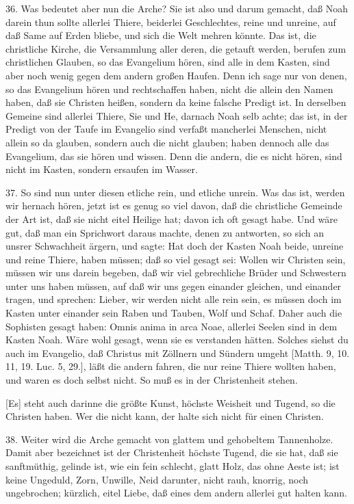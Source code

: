 36. Was bedeutet aber nun die Arche? Sie ist also und darum gemacht, daß Noah darein thun sollte allerlei Thiere, beiderlei Geschlechtes, reine und unreine, auf daß Same auf Erden bliebe, und sich die Welt mehren könnte. Das ist, die christliche Kirche, die Versammlung aller deren, die getauft werden, berufen zum christlichen Glauben, so das Evangelium hören, sind alle in dem Kasten, sind aber noch wenig gegen dem andern großen Haufen. Denn ich sage nur von denen, so das Evangelium hören und rechtschaffen haben, nicht die allein den Namen haben, daß sie Christen heißen, sondern da keine falsche Predigt ist. In derselben Gemeine sind allerlei Thiere, Sie und He, darnach Noah selb achte; das ist, in der Predigt von der Taufe im Evangelio sind verfaßt mancherlei Menschen, nicht allein so da glauben, sondern auch die nicht glauben; haben dennoch alle das Evangelium, das sie hören und wissen. Denn die andern, die es nicht hören, sind nicht im Kasten, sondern ersaufen im Wasser.

37. So sind nun unter diesen etliche rein, und etliche unrein. Was das ist, werden wir hernach hören, jetzt ist es genug so viel davon, daß die christliche Gemeinde der Art ist, daß sie nicht eitel Heilige hat; davon ich oft gesagt habe. Und wäre gut, daß man ein Sprichwort daraus machte, denen zu antworten, so sich an unsrer Schwachheit ärgern, und sagte: Hat doch der Kasten Noah beide, unreine und reine Thiere, haben müssen; daß so viel gesagt sei: Wollen wir Christen sein, müssen wir uns darein begeben, daß wir viel gebrechliche Brüder und Schwestern unter uns haben müssen, auf daß wir uns gegen einander gleichen, und einander tragen, und sprechen: Lieber, wir werden nicht alle rein sein, es müssen doch im Kasten unter einander sein Raben und Tauben, Wolf und Schaf. Daher auch die Sophisten gesagt haben: Omnis anima in arca Noae, allerlei Seelen sind in dem Kasten Noah. Wäre wohl gesagt, wenn sie es verstanden hätten. Solches siehst du auch im Evangelio, daß Christus mit Zöllnern und Sündern umgeht [Matth. 9, 10. 11, 19. Luc. 5, 29.], läßt die andern fahren, die nur reine Thiere wollten haben, und waren es doch selbst nicht. So muß es in der Christenheit stehen.

[Es] steht auch darinne die größte Kunst, höchste Weisheit und Tugend, so die Christen haben. Wer die nicht kann, der halte sich nicht für einen Christen.

38. Weiter wird die Arche gemacht von glattem und gehobeltem Tannenholze. Damit aber bezeichnet ist der Christenheit höchste Tugend, die sie hat, daß sie sanftmüthig, gelinde ist, wie ein fein schlecht, glatt Holz, das ohne Aeste ist; ist keine Ungeduld, Zorn, Unwille, Neid darunter, nicht rauh, knorrig, noch ungebrochen; kürzlich, eitel Liebe, daß eines dem andern allerlei gut halten kann.


